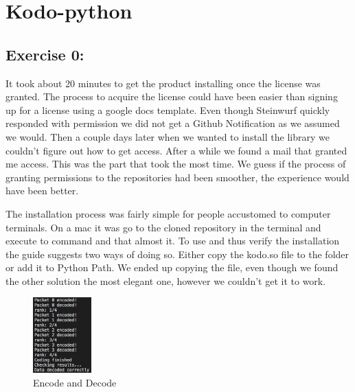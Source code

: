 \section{Kodo-python}

\subsection{Exercise 0:}
It took about 20 minutes to get the product installing once the license was granted. The process to acquire the license could have been easier than signing up for a license using a google docs template. Even though Steinwurf quickly responded with permission we did not get a Github Notification as we assumed we would. Then a couple days later when we wanted to install the library we couldn't figure out how to get access. After a while we found a mail that granted me access. This was the part that took the most time. We guess if the process of granting permissions to the repositories had been smoother, the experience would have been better.

The installation process was fairly simple for people accustomed to computer terminals. On a mac it was go to the cloned repository in the terminal and execute to command and that almost it. To use and thus verify the installation the guide suggests two ways of doing so. Either copy the kodo.so file to the folder or add it to Python Path. We ended up copying the file, even though we found the other solution the most elegant one, however we couldn't get it to work.

\begin{figure}[H]
    \centering
    \includegraphics[width=0.2\textwidth]{figures/KodoPython/encode_decode.png}
    \caption{Encode and Decode}
    \label{fig:encode_decode}
\end{figure}

